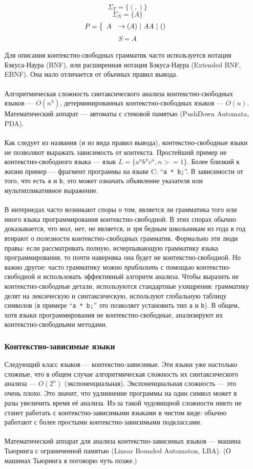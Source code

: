 \documentclass[11pt]{book}
\begin{document}
$$\Sigma_T=\{(,)\}$$
$$\Sigma_N=\{A\}$$
$$P=\left\{
\begin{array}{l l}
A & \rightarrow ( A )\ |\ A A\ |\ ()
\end{array}
\right. $$
$$S=A$$
\\
Для описания контекстно-свободных грамматик часто используется нотация Бэкуса-Наура (BNF),
или расширенная нотация Бэкуса-Наура (Extended BNF, EBNF).
Она мало отличается от обычных правил вывода.
\\ \\
Алгоритмическая сложность синтаксического анализа контекстно-свободных языков --- $O(n^3)$,
детерминированных контекстно-свободных языков --- $O(n)$.
Математический аппарат --- автоматы с стековой памятью (PushDown Automata, PDA).
\\ \\
Как следует из названия (и из вида правил вывода), контекстно-свободные языки не позволяют выражать зависимость от контекста.
Простейший пример не контекстно-свободного языка --- язык $L=\{a^n b^n c^n, n >= 1\}$.
Более близкий к жизни пример --- фрагмент программы на языке C: ``\texttt{a * b;}''.
В зависимости от того, что есть \texttt{a} и \texttt{b}, это может означать объявление указателя или мультипликативное выражение.
\\ \\
В интернедах часто возникают споры о том, является ли грамматика того или иного языка программирования контекстно-свободной.
В этих спорах обычно доказывается, что мол, нет, не является, и зря бедным школьникам из года в год втирают о полезности контекстно-свободных грамматик.
Формально эти люди правы: если рассматривать полную, исчерпывающую грамматику языка программирования,
то почти наверняка она будет не контекстно-свободной.
Но важно другое: часто грамматику можно \emph{приблизить} с помощью контекстно-свободной и использовать эффективный алгоритм анализа.
Чтобы выразить не контекстно-свободные детали, используются стандартные ухищрения:
грамматику делят на лексическую и синтаксическую,
используют глобальную таблицу символов (в примере ``\texttt{a * b;}'' это позволяет установить тип \texttt{a} и \texttt{b}).
В общем, хотя языки программирования не контекстно-свободные, анализируют их контекстно-свободными методами.

\subsubsection{Контекстно-зависимые языки}
Следующий класс языков --- контекстно-зависимые.
Эти языки уже настолько сложные, что в общем случае алгоритмическая сложность их синтаксического анализа --- $O(2^n)$ (экспоненциальная).
Экспоненциальная сложность --- это очень плохо.
Это значит, что удлиннение программы на один символ может в разы увеличить время её анализа.
Из-за такой чудовищной сложности никто не станет работать с контекстно-зависимыми языками в чистом виде:
обычно работают с более простыми контекстно-зависимыми подклассами.
\\ \\
Математический аппарат для анализа контекстно-зависимых языков --- машина Тьюринга с ограниченной памятью (Linear Bounded Automaton, LBA).
(О машинах Тьюринга я поговорю чуть позже.)
\end{document}
